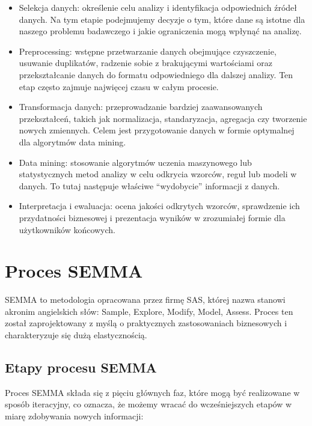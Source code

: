 \documentclass[
  polish,
  letterpaper,
  DIV=11,
  numbers=noendperiod]{scrreprt}
\begin{document}
\begin{itemize}
\item
  Selekcja danych: określenie celu analizy i identyfikacja odpowiednich
  źródeł danych. Na tym etapie podejmujemy decyzje o tym, które dane są
  istotne dla naszego problemu badawczego i jakie ograniczenia mogą
  wpłynąć na analizę.
\item
  Preprocessing: wstępne przetwarzanie danych obejmujące czyszczenie,
  usuwanie duplikatów, radzenie sobie z brakującymi wartościami oraz
  przekształcanie danych do formatu odpowiedniego dla dalszej analizy.
  Ten etap często zajmuje najwięcej czasu w całym procesie.
\item
  Transformacja danych: przeprowadzanie bardziej zaawansowanych
  przekształceń, takich jak normalizacja, standaryzacja, agregacja czy
  tworzenie nowych zmiennych. Celem jest przygotowanie danych w formie
  optymalnej dla algorytmów data mining.
\item
  Data mining: stosowanie algorytmów uczenia maszynowego lub
  statystycznych metod analizy w celu odkrycia wzorców, reguł lub modeli
  w danych. To tutaj następuje właściwe ``wydobycie'' informacji z
  danych.
\item
  Interpretacja i ewaluacja: ocena jakości odkrytych wzorców,
  sprawdzenie ich przydatności biznesowej i prezentacja wyników w
  zrozumiałej formie dla użytkowników końcowych.
\end{itemize}

\section{Proces SEMMA}\label{proces-semma}

SEMMA to metodologia opracowana przez firmę SAS, której nazwa stanowi
akronim angielskich słów: Sample, Explore, Modify, Model, Assess. Proces
ten został zaprojektowany z myślą o praktycznych zastosowaniach
biznesowych i charakteryzuje się dużą elastycznością.

\subsection{Etapy procesu SEMMA}\label{etapy-procesu-semma}

Proces SEMMA składa się z pięciu głównych faz, które mogą być
realizowane w sposób iteracyjny, co oznacza, że możemy wracać do
wcześniejszych etapów w miarę zdobywania nowych informacji:
\end{document}
